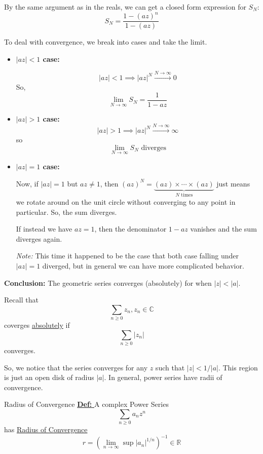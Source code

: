 \documentclass{article}
\newcommand{\C}{\mathbb{C}}
\begin{document}
\vskip 0.5cm
By the same argument as in the reals, we can get a closed form expression for $S_N$:
\[ S_N = \frac{1 - (az)^n}{1-(az)} \]

To deal with convergence, we break into cases and take the limit.
\begin{itemize}
  \item \textbf{$|az| < 1$ case:}
  
  \[ |az| < 1 \implies |az|^{N} \xrightarrow{N \rightarrow \infty} 0 \]
  So, 
  \[ \lim_{N \rightarrow \infty} S_N = \frac{1}{1 - az} \]

  \vskip 0.5cm
  \item \textbf{$|az| > 1$ case:}
  \[ |az| > 1 \implies |az|^{N} \xrightarrow{N \rightarrow \infty} \infty \]
  so 
  \[ \lim_{N \rightarrow \infty} S_N \text{ diverges} \]
  
  \vskip 0.5cm
  \item \textbf{$|az| = 1$ case:}
  
  Now, if $\left|az\right| = 1$ but $az \neq 1$, then $(az)^N = \underbrace{(az) \times \cdots \times (az)}_{N \text{ times}}$ just means we rotate around on the unit circle without converging to any point in particular. So, the sum diverges.

  \vskip 0.25cm
  If instead we have $az = 1$, then the denominator $1 - az$ vanishes and the sum diverges again.

  \vskip 0.25cm
  \emph{Note:} This time it happened to be the case that both case falling under $|az| = 1$ diverged, but in general we can have more complicated behavior.

\end{itemize}

\textbf{Conclusion:} The geometric series converges (absolutely) for when $|z| < |a|$.

\vskip 0.5cm
\begin{dottedbox}
  Recall that 
  \[ \sum_{n \geq 0} z_n, z_n \in \C \] coverges \underline{absolutely} if 
  \[ \sum_{n \geq 0} |z_n| \] converges. 
\end{dottedbox}

\vskip 0.5cm
So, we notice that the series converges for any $z$ such that $|z| < 1/|a|$. This region is just an open disk of radius $|a|$. In general, power series have radii of convergence.

\begin{mathdefinitionbox}{Radius of Convergence}
  \vskip 0.5cm
  \underline{\textbf{Def: }} A complex Power Series
  \[ \sum_{n \geq 0} a_n z^n \]
  has \underline{Radius of Convergence}
  \[ r = \left( \lim_{n \rightarrow \infty} \sup |a_n|^{1/n} \right)^{-1} \in \mathbb{R} \]
\end{mathdefinitionbox}
\end{document}
